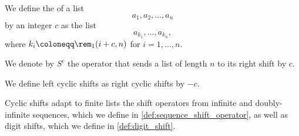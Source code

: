 \begin{definition}\label{def:cyclic_shift}\mimprovised
  We define the  of a list
  \begin{equation*}
    a_1, a_2, \ldots, a_n
  \end{equation*}
  by an integer \( c \) as the list
  \begin{equation*}
    a_{k_1}, \ldots, a_{k_n},
  \end{equation*}
  where \( k_i \coloneqq \rem_1(i + c, n) \) for \( i = 1, \ldots, n \).

  We denote by \( S^c \) the operator that sends a list of length \( n \) to its right shift by \( c \).

  We define left cyclic shifts as right cyclic shifts by \( -c \).
\end{definition}
\begin{comments}
  \item Cyclic shifts adapt to finite lists the shift operators from infinite and doubly-infinite sequences, which we define in \cref{def:sequence_shift_operator}, as well as digit shifts, which we define in \cref{def:digit_shift}.
\end{comments}

